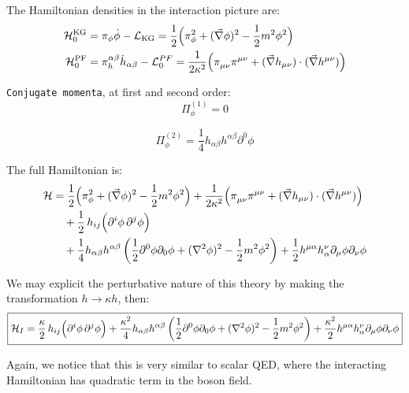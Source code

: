 \documentclass[12pt,a4paper]{article}
\begin{document}
The Hamiltonian densities in the interaction picture are:
\begin{align}
    \mathcal{H}_0^{\mathrm{KG}} &= \pi_\phi \dot\phi - \mathcal{L}_{\mathrm{KG}} = \frac{1}{2}\Bigl(\pi_{\phi}^2 + (\vec{\nabla}\phi)^2 - \frac12m^2\phi^2\Bigr) \\
    \mathcal{H}_0^{\mathrm{PF}} &= \pi_h^{\alpha \beta} \dot h_{\alpha \beta} - \mathcal{L}_0^{PF} = \frac{1}{2\kappa^2}\Bigl(\pi_{\mu\nu}^{\ }\pi^{\mu\nu} + (\vec{\nabla}h_{\mu\nu})\cdot(\vec{\nabla}h^{\mu\nu})\Bigr)
\end{align}

\texttt{Conjugate momenta}, at first and second order:
\begin{equation}
    \Pi_\phi ^{(1)}= 0
\end{equation}

\begin{equation}
\Pi_\phi ^{(2)} = \frac{1}{4} h_{\alpha\beta}h^{\alpha\beta}\partial^0\phi
\end{equation}

The full Hamiltonian is:
\begin{align}
    \mathcal{H} &= \frac{1}{2}\Bigl(\pi_\phi^2 + (\vec{\nabla}\phi)^2 - \frac12m^2\phi^2 \Bigr)+ \frac{1}{2\kappa^2}\Bigl(\pi_{\mu\nu}^{\ }\pi^{\mu\nu} + (\vec{\nabla}h_{\mu\nu})\cdot(\vec{\nabla}h^{\mu\nu})\Bigr) \notag\\
    & \quad+ \frac12\, h_{ij} \Bigl(\partial^i\phi\,\partial^j\phi \Bigr)  \\ &  \quad+ \frac{1}{4} h_{\alpha\beta}h^{\alpha\beta} \left( \frac{1}{2} \partial^0\phi \partial_0\phi + (\nabla^2\phi)^2 - \frac{1}{2}m^2\phi^2 \right) + \frac{1}{2} h^{\mu\alpha}h_{\alpha}^{\nu} \partial_\mu\phi\partial_\nu\phi 
\end{align}

We may explicit the perturbative nature of this theory by making the transformation $h \rightarrow \kappa  h$, then:
\begin{align}
    \boxed{
    \mathcal{H}_I= \frac{\kappa}2\, h_{ij} \Bigl(\partial^i\phi\,\partial^j\phi \Bigr) + \frac{\kappa^2}{4} h_{\alpha\beta}h^{\alpha\beta} \left( \frac{1}{2} \partial^0\phi \partial_0\phi + (\nabla^2\phi)^2 - \frac{1}{2}m^2\phi^2 \right) + \frac{\kappa^2}{2} h^{\mu\alpha}h_{\alpha}^{\nu} \partial_\mu\phi\partial_\nu\phi}
\end{align}

Again, we notice that this is very similar to scalar QED, where the interacting Hamiltonian has quadratic term in the boson field.
\end{document}
